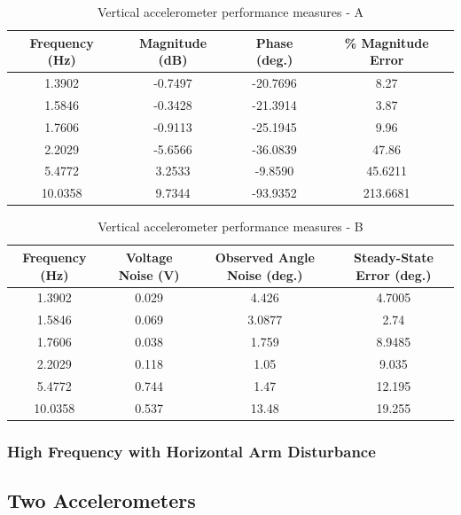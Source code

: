 \documentclass{article}
\theoremstyle{plain}
\theoremstyle{definition}
\theoremstyle{remark}
\begin{document}
\begin{table}
\begin{center}
    \begin{tabular}{|c|c|c|c|}
        \hline
        Frequency (Hz)  & Magnitude (dB) & Phase (deg.) & \% Magnitude Error \\ \hline
	1.3902  & -0.7497  & -20.7696 & 8.27\\
       1.5846  & -0.3428  & -21.3914 & 3.87 \\
	1.7606  & -0.9113 & -25.1945 & 9.96  \\
	2.2029 & -5.6566  & -36.0839 & 47.86   \\
	5.4772 & 3.2533  & -9.8590 & 45.6211  \\
	10.0358 & 9.7344 & -93.9352 & 213.6681 \\
        \hline
    \end{tabular}
\caption{Vertical accelerometer performance measures - A}  
\label{vertical_tableA}
\end{center}
\end{table}

\begin{table}
\begin{center}
    \begin{tabular}{|c|c|c|c|}
        \hline
        Frequency (Hz)  & Voltage Noise (V) & Observed Angle Noise (deg.) & Steady-State Error (deg.) \\ \hline
	1.3902  & 0.029  & 4.426 & 4.7005\\
       1.5846  & 0.069  & 3.0877 & 2.74 \\
	1.7606  & 0.038 & 1.759 & 8.9485  \\
	2.2029 & 0.118  & 1.05 & 9.035   \\
	5.4772 & 0.744  & 1.47 & 12.195  \\
	10.0358 & 0.537 & 13.48 & 19.255 \\
        \hline
    \end{tabular}
\caption{Vertical accelerometer performance measures - B}  
\label{Vertical_tableB}
\end{center}
\end{table}


\subsubsection{High Frequency with Horizontal Arm Disturbance}
\clearpage
\subsection{Two Accelerometers}
\end{document}
